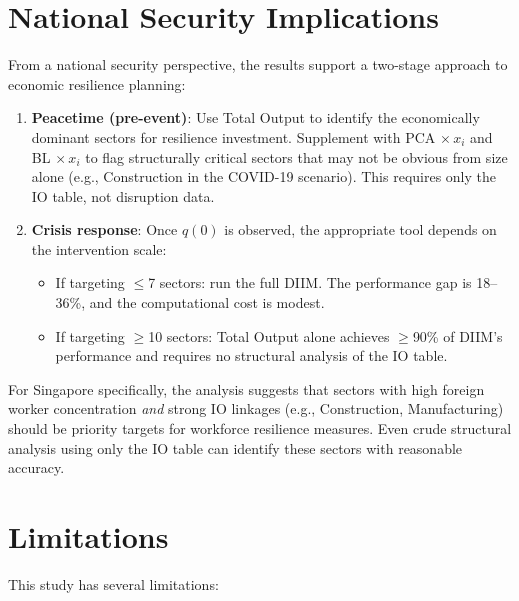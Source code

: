 \section{National Security Implications}

From a national security perspective, the results support a two-stage approach to economic resilience planning:

\begin{enumerate}
    \item \textbf{Peacetime (pre-event)}: Use Total Output to identify the economically dominant sectors for resilience investment. Supplement with PCA $\times\, x_i$ and BL $\times\, x_i$ to flag structurally critical sectors that may not be obvious from size alone (e.g., Construction in the COVID-19 scenario). This requires only the IO table, not disruption data.

    \item \textbf{Crisis response}: Once $q(0)$ is observed, the appropriate tool depends on the intervention scale:
    \begin{itemize}
        \item If targeting $\leq$7 sectors: run the full DIIM. The performance gap is 18--36\%, and the computational cost is modest.
        \item If targeting $\geq$10 sectors: Total Output alone achieves $\geq$90\% of DIIM's performance and requires no structural analysis of the IO table.
    \end{itemize}
\end{enumerate}

For Singapore specifically, the analysis suggests that sectors with high foreign worker concentration \emph{and} strong IO linkages (e.g., Construction, Manufacturing) should be priority targets for workforce resilience measures. Even crude structural analysis using only the IO table can identify these sectors with reasonable accuracy.


\section{Limitations}

This study has several limitations:

